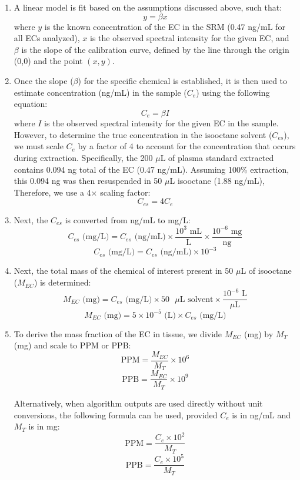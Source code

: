\begin{enumerate}
\item A linear model is fit based on the assumptions discussed above, such that:
$$y = \beta x$$
where $y$ is the known concentration of the EC in the SRM (0.47 ng/mL for all ECs analyzed), $x$ is the observed spectral intensity for the given EC, and $\beta$ is the slope of the calibration curve, defined by the line through the origin (0,0) and the point $(x,y)$.

\item Once the slope ($\beta$) for the specific chemical is established, it is then used to estimate concentration (ng/mL) in the sample ($C_e$) using the following equation:
$$C_e = \beta I$$
where $I$ is the observed spectral intensity for the given EC in the sample. However, to determine the true concentration in the isooctane solvent ($C_{es}$), we must scale $C_e$ by a factor of 4 to account for the concentration that occurs during extraction. Specifically, the 200 $\mu$L of plasma standard extracted contains 0.094 ng total of the EC (0.47 ng/mL). Assuming 100\% extraction, this 0.094 ng was then resuspended in 50 $\mu$L isooctane (1.88 ng/mL), Therefore, we use a 4$\times$ scaling factor:
$$C_{es} = 4C_e$$

\item Next, the $C_{es}$ is converted from ng/mL to mg/L:
$$C_{es} \text{ (mg/L)} = C_{es} \text{ (ng/mL)} \times \frac{10^3 \text{ mL}}{\text{L}} \times \frac{10^{-6} \text{ mg}}{\text{ng}}$$
$$C_{es} \text{ (mg/L)} = C_{es} \text{ (ng/mL)} \times 10^{-3}$$

\item Next, the total mass of the chemical of interest present in 50 $\mu$L of isooctane ($M_{EC}$) is determined:
$$M_{EC} \text{ (mg)} = C_{es} \text{ (mg/L)} \times 50 \text{ }\mu\text{L solvent} \times \frac{10^{-6} \text{ L}}{\mu\text{L}}$$
$$M_{EC} \text{ (mg)} = 5 \times 10^{-5} \text{ (L)} \times C_{es} \text{ (mg/L)}$$

\item To derive the mass fraction of the EC in tissue, we divide $M_{EC}$ (mg) by $M_T$ (mg) and scale to PPM or PPB:
$$\text{PPM} = \frac{M_{EC}}{M_T} \times 10^6$$
$$\text{PPB} = \frac{M_{EC}}{M_T} \times 10^9$$

Alternatively, when algorithm outputs are used directly without unit conversions, the following formula can be used, provided $C_e$ is in ng/mL and $M_T$ is in mg:
$$\text{PPM} = \frac{C_e \times 10^2}{M_T}$$
$$\text{PPB} = \frac{C_e \times 10^5}{M_T}$$
\end{enumerate}

